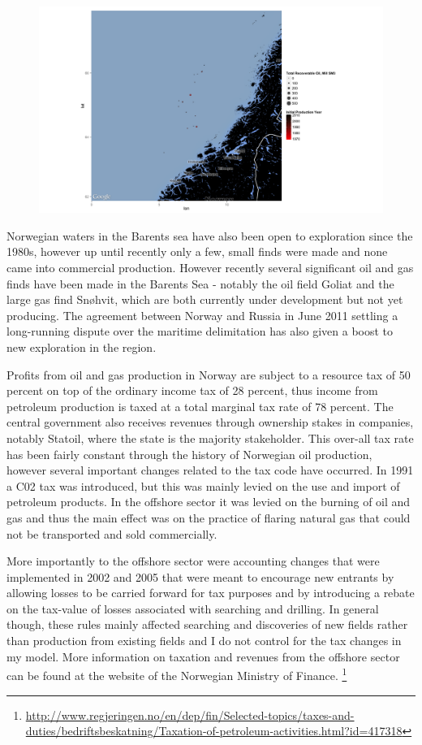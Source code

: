 \documentclass[12pt]{article}
\begin{document}
\begin{figure}
\includegraphics[width=1\textwidth]{figures/norwegian_sea_reserves_print.png}
\caption{}
\label{norwegian_sea_reserves}
\end{figure}

Norwegian waters in the Barents sea have also been open to exploration since the 1980s, however up until recently only a few, small finds were made and none came into commercial production.  However recently several significant oil and gas finds have been made in the Barents Sea - notably the oil field Goliat and the large gas find Sn\o hvit, which are both currently under development but not yet producing.  The agreement between Norway and Russia in June 2011 settling a long-running dispute over the maritime delimitation has also given a boost to new exploration in the region.  

Profits from oil and gas production in Norway are subject to a resource tax of 50 percent on top of the ordinary income tax of 28 percent, thus income from petroleum production is taxed at a total marginal tax rate of 78 percent.  The central government also receives revenues through ownership stakes in companies, notably Statoil, where the state is the majority stakeholder.  This over-all tax rate has been fairly constant through the history of Norwegian oil production, however several important changes related to the tax code have occurred.  In 1991 a C02 tax was introduced, but this was mainly levied on the use and import of petroleum products.  In the offshore sector it was levied on the burning of oil and gas and thus the main effect was on the practice of flaring natural gas that could not be transported and sold commercially.   

More importantly to the offshore sector were accounting changes that were implemented in 2002 and 2005 that were meant to encourage new entrants by allowing losses to be carried forward for tax purposes and by introducing a rebate on the tax-value of losses associated with searching and drilling.  In general though, these rules mainly affected searching and discoveries of new fields rather than production from existing fields and I do not control for the tax changes in my model.  More information on taxation and revenues from the offshore sector can be found at the website of the Norwegian Ministry of Finance. \footnote{\url{http://www.regjeringen.no/en/dep/fin/Selected-topics/taxes-and-duties/bedriftsbeskatning/Taxation-of-petroleum-activities.html?id=417318}}
\end{document}
